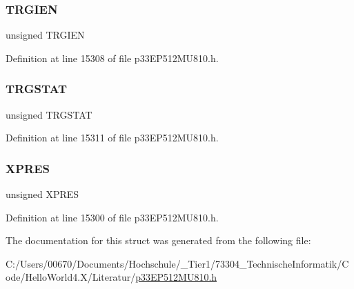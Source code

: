 \subsubsection{\texorpdfstring{T\+R\+G\+I\+EN}{TRGIEN}}
{\footnotesize\ttfamily unsigned T\+R\+G\+I\+EN}



Definition at line 15308 of file p33\+E\+P512\+M\+U810.\+h.

\mbox{\label{structtag_p_w_m_c_o_n6_b_i_t_s_a57c6135a12bae69a2a2cac5ed50a4a6d}} 
\subsubsection{\texorpdfstring{T\+R\+G\+S\+T\+AT}{TRGSTAT}}
{\footnotesize\ttfamily unsigned T\+R\+G\+S\+T\+AT}



Definition at line 15311 of file p33\+E\+P512\+M\+U810.\+h.

\mbox{\label{structtag_p_w_m_c_o_n6_b_i_t_s_a6a3f824223966417e0005dbe08b1833c}} 
\subsubsection{\texorpdfstring{X\+P\+R\+ES}{XPRES}}
{\footnotesize\ttfamily unsigned X\+P\+R\+ES}



Definition at line 15300 of file p33\+E\+P512\+M\+U810.\+h.



The documentation for this struct was generated from the following file\+:\begin{DoxyCompactItemize}
\item 
C\+:/\+Users/00670/\+Documents/\+Hochschule/\+\_\+\+Tier1/73304\+\_\+\+Technische\+Informatik/\+Code/\+Hello\+World4.\+X/\+Literatur/\hyperlink{p33_e_p512_m_u810_8h}{p33\+E\+P512\+M\+U810.\+h}\end{DoxyCompactItemize}
